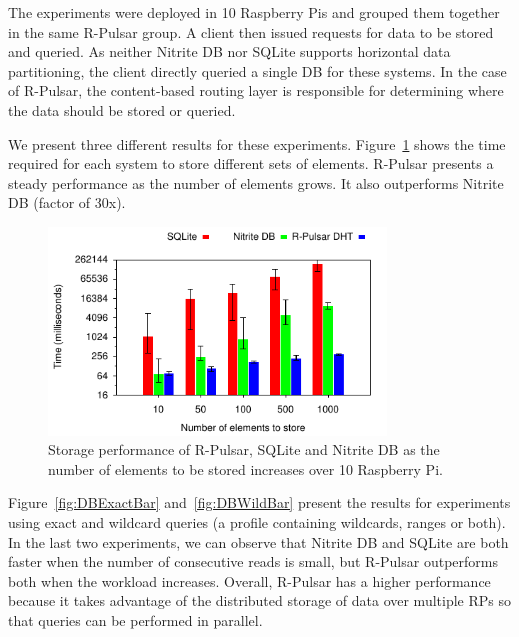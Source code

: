 The experiments were deployed in 10 Raspberry Pis and grouped them together in the same R-Pulsar group. A client then issued requests for data to be stored and queried. As neither Nitrite DB nor SQLite supports horizontal data partitioning, the client directly queried a single DB for these systems. In the case of R-Pulsar, the content-based routing layer is responsible for determining where the data should be stored or queried.

We present three different results for these experiments. Figure~\ref{fig:DBInsertBar} shows the time required for each system to store different sets of elements. R-Pulsar presents a steady performance as the number of elements grows. It also outperforms Nitrite DB (factor of 30x).

\begin{figure}[h!]
  \centering
  \includegraphics[width=0.8\textwidth]{Results/DBInsertBar}
  \caption{Storage performance of R-Pulsar, SQLite and Nitrite DB as the number of elements to be stored increases over 10 Raspberry Pi.}
  \label{fig:DBInsertBar}
\end{figure}

Figure~\ref{fig:DBExactBar} and~\ref{fig:DBWildBar} present the results for experiments using exact and wildcard queries (a profile containing wildcards, ranges or both).
In the last two experiments, we can observe that Nitrite DB and SQLite are both faster when the number of consecutive reads is small, but R-Pulsar outperforms both when the workload increases. Overall, R-Pulsar has a higher performance because it takes advantage of the distributed storage of data over multiple RPs so that queries can be performed in parallel.

